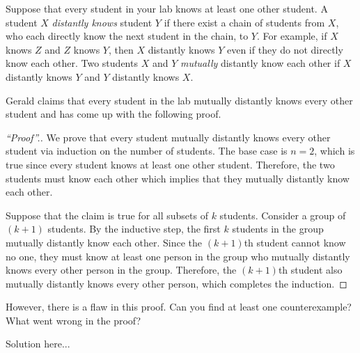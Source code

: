 \documentclass{article}
\begin{document}
\begin{question}
Suppose that every student in your lab knows at least one other student. A student $X$ {\em distantly knows} student $Y$ if there exist a chain of students from $X$, who each directly know the next student in the chain, to $Y$. For example, if $X$ knows $Z$ and $Z$ knows $Y$, then $X$ distantly knows $Y$ even if they do not directly know each other. Two students $X$ and $Y$ {\em mutually} distantly know each other if $X$ distantly knows $Y$ and $Y$ distantly knows $X$.

Gerald claims that every student in the lab mutually distantly knows every other student and has come up with the following proof.
\begin{proof}[``Proof''.]
We prove that every student mutually distantly knows every other student via induction on the number of students. The base case is $n = 2$, which is true since every student knows at least one other student. Therefore, the two students must know each other which implies that they mutually distantly know each other.

Suppose that the claim is true for all subsets of $k$ students. Consider a group of $(k + 1)$ students. By the inductive step, the first $k$ students in the group mutually distantly know each other. Since the $(k + 1)$th student cannot know no one, they must know at least one person in the group who mutually distantly knows every other person in the group. Therefore, the $(k + 1)$th student also mutually distantly knows every other person, which completes the induction.
\end{proof}

However, there is a flaw in this proof. Can you find at least one counterexample? What went wrong in the proof?
\end{question}

\begin{solution}
Solution here...
\end{solution}
\end{document}
